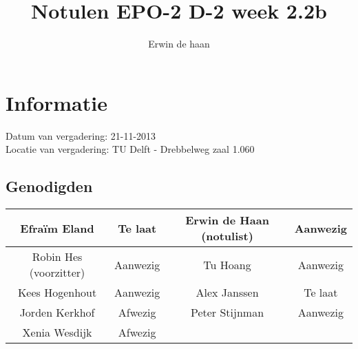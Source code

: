 \documentclass{article}
\begin{document}
\title{Notulen EPO-2 D-2 week 2.2b }%
\author{Erwin de haan}%
\maketitle

\section*{Informatie}
Datum van vergadering: 21-11-2013 \\ %
Locatie van vergadering: TU Delft - Drebbelweg zaal 1.060 %
\subsection*{Genodigden}
\begin{center}
\begin{tabular}{|c |c | c| c|}
	\hline
Efraïm Eland & Te laat & Erwin de Haan (notulist) & Aanwezig \\
	\hline
Robin Hes (voorzitter) & Aanwezig & Tu Hoang & Aanwezig \\
	\hline
Kees Hogenhout & Aanwezig & Alex Janssen & Te laat\\
	\hline
Jorden Kerkhof & Afwezig & Peter Stijnman & Aanwezig \\
	\hline
Xenia Wesdijk & Afwezig & & \\
	\hline
\end{tabular}
\end{center}
\end{document}
